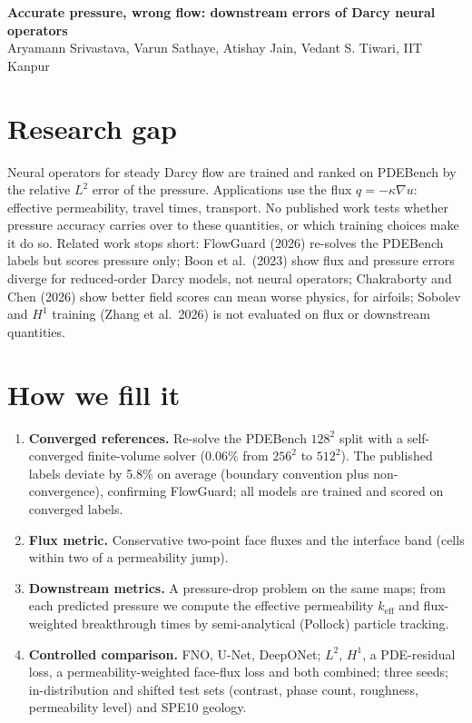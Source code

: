 \documentclass[10pt]{article}
\begin{document}
\begin{center}
{\large\bfseries Accurate pressure, wrong flow: downstream errors of Darcy neural operators}\\[2pt]
Aryamann Srivastava, Varun Sathaye, Atishay Jain, Vedant S. Tiwari, IIT Kanpur
\end{center}

\section{Research gap}
Neural operators for steady Darcy flow are trained and ranked on PDEBench by the relative $L^2$ error of the pressure.
Applications use the flux $q=-\kappa\nabla u$: effective permeability, travel times, transport. No published work tests
whether pressure accuracy carries over to these quantities, or which training choices make it do so. Related work stops
short: FlowGuard (2026) re-solves the PDEBench labels but scores pressure only; Boon et al.\ (2023) show flux and pressure
errors diverge for reduced-order Darcy models, not neural operators; Chakraborty and Chen (2026) show better field scores
can mean worse physics, for airfoils; Sobolev and $H^1$ training (Zhang et al.\ 2026) is not evaluated on flux or
downstream quantities.

\section{How we fill it}
\begin{enumerate}
\item \textbf{Converged references.} Re-solve the PDEBench $128^2$ split with a self-converged finite-volume solver
(0.06\% from $256^2$ to $512^2$). The published labels deviate by 5.8\% on average (boundary convention plus
non-convergence), confirming FlowGuard; all models are trained and scored on converged labels.
\item \textbf{Flux metric.} Conservative two-point face fluxes and the interface band (cells within two of a permeability jump).
\item \textbf{Downstream metrics.} A pressure-drop problem on the same maps; from each predicted pressure we compute the
effective permeability $k_{\mathrm{eff}}$ and flux-weighted breakthrough times by semi-analytical (Pollock) particle tracking.
\item \textbf{Controlled comparison.} FNO, U-Net, DeepONet; $L^2$, $H^1$, a PDE-residual loss, a permeability-weighted face-flux loss and both combined;
three seeds; in-distribution and shifted test sets (contrast, phase count, roughness, permeability level) and SPE10 geology.
\end{enumerate}
\end{document}
